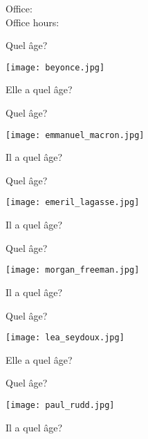 \documentclass{beamer}
\subtitle[Nombres et adjectifs]{Les nombres et les adjectifs}
\begin{document}
  \begin{frame}
    \titlepage
    \tiny{Office: \\
          Office hours: }
  \end{frame}

  \begin{frame}{Quel âge?}
    \begin{center}
      \texttt{[image: beyonce.jpg]}

      Elle a quel âge? \underline{}
    \end{center}
  \end{frame}

  \begin{frame}{Quel âge?}
    \begin{center}
      \texttt{[image: emmanuel\_macron.jpg]}

      Il a quel âge? \underline{}
    \end{center}
  \end{frame}

  \begin{frame}{Quel âge?}
    \begin{center}
      \texttt{[image: emeril\_lagasse.jpg]}

      Il a quel âge? \underline{}
    \end{center}
  \end{frame}

  \begin{frame}{Quel âge?}
    \begin{center}
      \texttt{[image: morgan\_freeman.jpg]}

      Il a quel âge? \underline{}
    \end{center}
  \end{frame}

  \begin{frame}{Quel âge?}
    \begin{center}
      \texttt{[image: lea\_seydoux.jpg]}

      Elle a quel âge? \underline{}
    \end{center}
  \end{frame}

  \begin{frame}{Quel âge?}
    \begin{center}
      \texttt{[image: paul\_rudd.jpg]}

      Il a quel âge? \underline{}
    \end{center}
  \end{frame}
\end{document}
